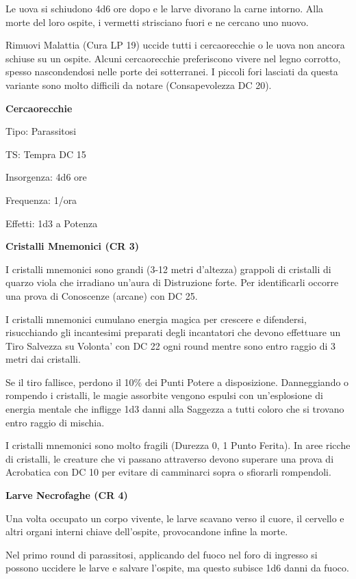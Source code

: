 \documentclass[a4paper,11pt,twoside,openany]{dndbook}
\begin{document}
Le uova si schiudono 4d6 ore dopo e le larve divorano la carne intorno. Alla morte del loro ospite, i vermetti strisciano fuori e ne cercano uno nuovo.

Rimuovi Malattia (Cura LP 19) uccide tutti i cercaorecchie o le uova non ancora schiuse su un ospite. Alcuni cercaorecchie preferiscono vivere nel legno corrotto, spesso nascondendosi nelle porte dei sotterranei. I piccoli fori lasciati da questa variante sono molto difficili da notare (Consapevolezza DC 20).

\textbf{Cercaorecchie}

Tipo: Parassitosi

TS: Tempra DC 15

Insorgenza: 4d6 ore

Frequenza: 1/ora

Effetti: 1d3 a Potenza

\textbf{Cristalli Mnemonici (CR 3)}

I cristalli mnemonici sono grandi (3-12 metri d'altezza) grappoli di cristalli di quarzo viola che irradiano un'aura di Distruzione forte. Per identificarli occorre una prova di Conoscenze (arcane) con DC 25.

I cristalli mnemonici cumulano energia magica per crescere e difendersi, risucchiando gli incantesimi preparati degli incantatori che devono effettuare un Tiro Salvezza su Volonta' con DC 22 ogni round mentre sono entro raggio di 3 metri dai cristalli.

Se il tiro fallisce, perdono il 10\% dei Punti Potere a disposizione. Danneggiando o rompendo i cristalli, le magie assorbite vengono espulsi con un'esplosione di energia mentale che infligge 1d3 danni alla Saggezza a tutti coloro che si trovano entro raggio di mischia.

I cristalli mnemonici sono molto fragili (Durezza 0, 1 Punto Ferita).
In aree ricche di cristalli, le creature che vi passano attraverso devono superare una prova di Acrobatica con DC 10 per evitare di camminarci sopra o sfiorarli rompendoli.

\textbf{Larve Necrofaghe (CR 4)}

Una volta occupato un corpo vivente, le larve scavano verso il cuore, il cervello e altri organi interni chiave dell'ospite, provocandone infine la morte.

Nel primo round di parassitosi, applicando del fuoco nel foro di ingresso si possono uccidere le larve e salvare l'ospite, ma questo subisce 1d6 danni da fuoco. 
\end{document}
